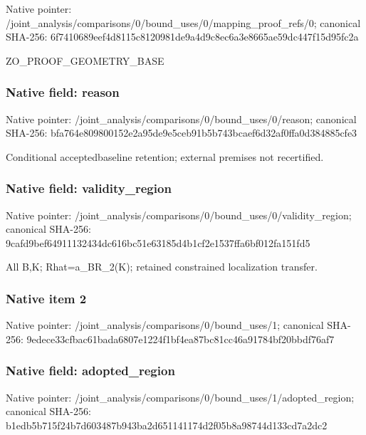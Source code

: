 \documentclass[10pt,a4paper]{article}
\begin{document}
Native pointer: /joint\_analysis/comparis\allowbreak{}ons/0/bound\_uses/0/mappi\allowbreak{}ng\_proof\_refs/0; canonical SHA-256: 6f7410689eef4d8115c81209\allowbreak{}81de9a4d9c8ec6a3e8665ae5\allowbreak{}9dc447f15d95fc2a


ZO\_PROOF\_GEOMETRY\_BASE


\subsubsection{Native field: reason}


Native pointer: /joint\_analysis/comparis\allowbreak{}ons/0/bound\_uses/0/reaso\allowbreak{}n; canonical SHA-256: bfa764e809800152e2a95de9\allowbreak{}e5ceb91b5b743bcaef6d32af\allowbreak{}0ffa0d384885cfe3


Conditional acceptedbaseline retention; external premises not recertified.


\subsubsection{Native field: validity\_region}


Native pointer: /joint\_analysis/comparis\allowbreak{}ons/0/bound\_uses/0/valid\allowbreak{}ity\_region; canonical SHA-256: 9cafd9bef64911132434dc61\allowbreak{}6bc51e63185d4b1cf2e1537f\allowbreak{}fa6bf012fa151fd5


All B,K; Rhat=a\_BR\_2(K); retained constrained localization transfer.


\subsubsection{Native item 2}


Native pointer: /joint\_analysis/comparis\allowbreak{}ons/0/bound\_uses/1; canonical SHA-256: 9edece33cfbac61bada6807e\allowbreak{}1224f1bf4ea87bc81cc46a91\allowbreak{}784bf20bbdf76af7



\subsubsection{Native field: adopted\_region}


Native pointer: /joint\_analysis/comparis\allowbreak{}ons/0/bound\_uses/1/adopt\allowbreak{}ed\_region; canonical SHA-256: b1edb5b715f24b7d603487b9\allowbreak{}43ba2d651141174d2f05b8a9\allowbreak{}8744d133cd7a2dc2
\end{document}
